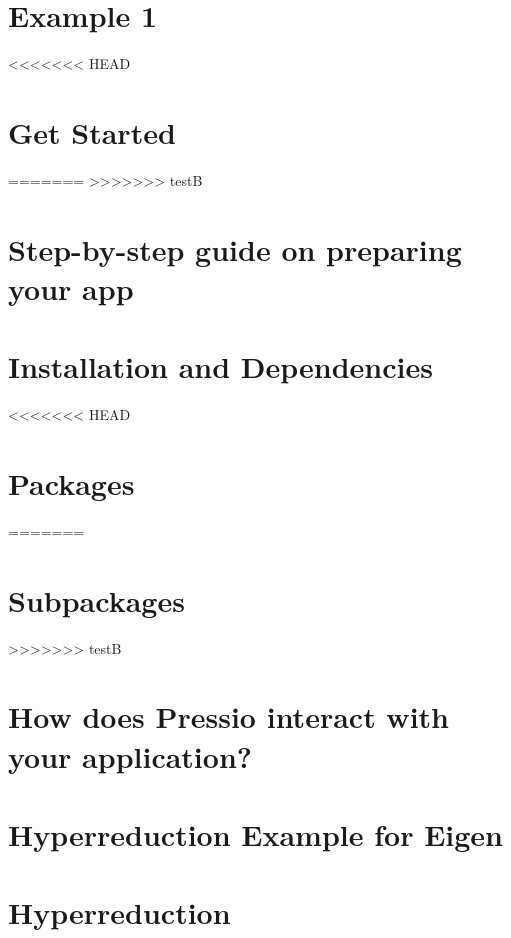 \let\mypdfximage\pdfximage\def\pdfximage{\immediate\mypdfximage}\documentclass[twoside]{book}
\newcommand{\+}{\discretionary{\mbox{\scriptsize$\hookleftarrow$}}{}{}}
\begin{document}
\chapter{Example 1}
\label{md_pages_examples_example1}

<<<<<<< HEAD
\chapter{Get Started}
\label{md_pages_get_started}

=======
>>>>>>> testB
\chapter{Step-\/by-\/step guide on preparing your app}
\label{md_pages_getstarted_adapting_app}

\chapter{Installation and Dependencies}
\label{md_pages_getstarted_build_and_install}

<<<<<<< HEAD
\chapter{Packages}
=======
\chapter{Subpackages}
>>>>>>> testB
\label{md_pages_getstarted_packages}

\chapter{How does Pressio interact with your application?}
\label{md_pages_getstarted_pressio_app}

\chapter{Hyperreduction Example for Eigen}
\label{md_pages_hyperreduction_hyperred_eigen_example}

\chapter{Hyperreduction}
\label{md_pages_hyperreduction_hyperred_how_to_enable}

\end{document}
